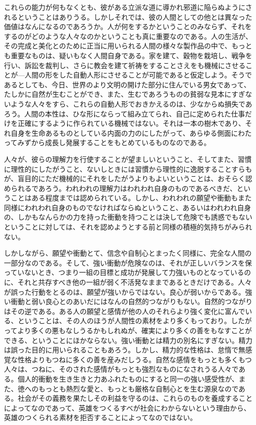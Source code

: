 これらの能力が何もなくとも、彼がある立派な道に導かれ邪道に陥らぬようにされるということはありうる。しかしそれでは、彼の人間としての他とは異なった価値はなんになるのであろうか。人が何をするかということのみならず、それをするのがどのような人々なのかということも真に重要なのである。人の生活が、その完成と美化とのために正当に用いられる人間の様々な製作品の中で、もっとも重要なものは、疑いもなく人間自身である。家を建て、穀物を栽培し、戦争を行い、訴訟を裁判し、さらに教会を建て祈祷をすることさえをも機械にさせることが{\——}人間の形をした自動人形にさせることが可能であると仮定しよう。そうであるとしても、今日、世界のより文明の開けた部分に住んでいる男女であって、たしかに自然が生むことができ、また、生むであろうものの貧弱な見本にすぎないような人々をすら、これらの自動人形でおきかえるのは、少なからぬ損失であろう。人間の本性は、ひな形にならって組み立てられ、自己に定められた仕事だけを正確にするように作られている機械ではない。それは一本の樹木であり、それ自身を生命あるものとしている内面の力のにしたがって、あらゆる側面にわたってみずから成長し発展することをもとめているものなのである。



人々が、彼らの理解力を行使することが望ましいということ、そしてまた、習慣に理性的にしたがうこと、ないしときには習慣から理性的に逸脱することすらもが、盲目的にただ機械的にそれをしたがうよりもよいということは、おそらく認められるであろう。われわれの理解力はわれわれ自身のものであるべきだ、ということはある程度までは認められている。しかし、われわれの願望や衝動もまた同様にわれわれ自身のものでなければならぬということ、あるいはわれわれ自身の、しかもなんらかの力を持った衝動を持つことは決して危険でも誘惑でもないということに対しては、それを認めようとする前と同様の積極的気持ちがみられない。


しかしながら、願望や衝動とて、信念や自制心とまったく同様に、完全な人間の一部分なのである。そして、強い衝動が危険なのは、それが正しいバランスを保っていないとき、つまり一組の目標と成功が発展して力強いものとなっているのに、それと共存すべき他の一組が弱く不活発なままであるときだけである。人々が誤った行動をとるのは、願望が強いからではない。良心が弱いからである。強い衝動と弱い良心とのあいだにはなんの自然的つながりもない。自然的つながりはその逆である。ある人の願望と感情が他の人のそれらより強く変化に富んでいる、ということは、その人のほうが人間性の素材をより多くもっており。したがってより多くの悪もなしうるかもしれぬが、確実により多くの善をもなすことができる、ということにほかならない。強い衝動とは精力の別名にすぎない。精力は誤った目的に用いられることもあろう。しかし、精力的な性格は、怠惰で無感覚な性格よりもつねに多くの善を産みだしうる。自然な感情をもっとも多くもつ人々は、つねに、そのされた感情がもっとも強烈なものになされうる人々である。個人的衝動を生き生きと力あふれたものにすると同一の強い感受性が、また、徳へのもっとも熱烈な愛と、もっとも厳格な自制心とを生む源泉なのである。社会がその義務を果たしその利益を守るのは、これらのものを養成することによってなのであって、英雄をつくるすべが社会にわからないという理由から、英雄のつくられる素材を拒否することによってなのではない。


